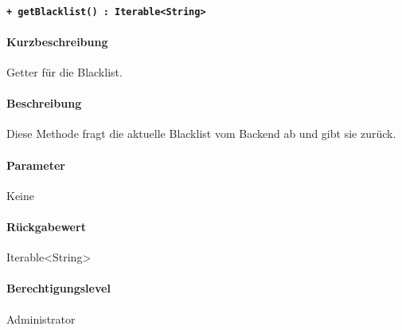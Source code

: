 \paragraph{\texttt{+ getBlacklist() : Iterable<String>}}\label{AP_Framework_getBlacklist}%
\paragraph*{Kurzbeschreibung}
Getter für die Blacklist.
\paragraph*{Beschreibung}
Diese Methode fragt die aktuelle Blacklist vom Backend ab und gibt sie zurück.
\paragraph*{Parameter}
Keine
\paragraph*{Rückgabewert}
Iterable<String>
\paragraph*{Berechtigungslevel}
Administrator
